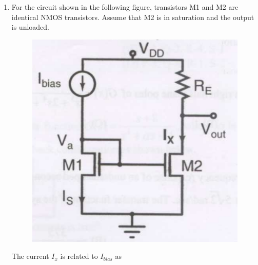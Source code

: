 \documentclass[a4paper, 11pt]{article}
\begin{document}
\begin{enumerate}
    \begin{enumerate}
    \end{enumerate}

    \hfill{}
    \newpage
    \item For the circuit shown in the following figure, transistors M1 and M2 are identical NMOS transistors. Assume that M2 is in saturation and the output is unloaded.
    \begin{figure}[H]
        \centering
        \includegraphics[width=0.5\columnwidth]{q44}
        \caption*{}
        \label{fig:q44}
    \end{figure}
    The current $I_x$ is related to $I_{bias}$ as
    \begin{enumerate}
    \end{enumerate}
    
    \hfill{}


\end{enumerate}
\end{document}
